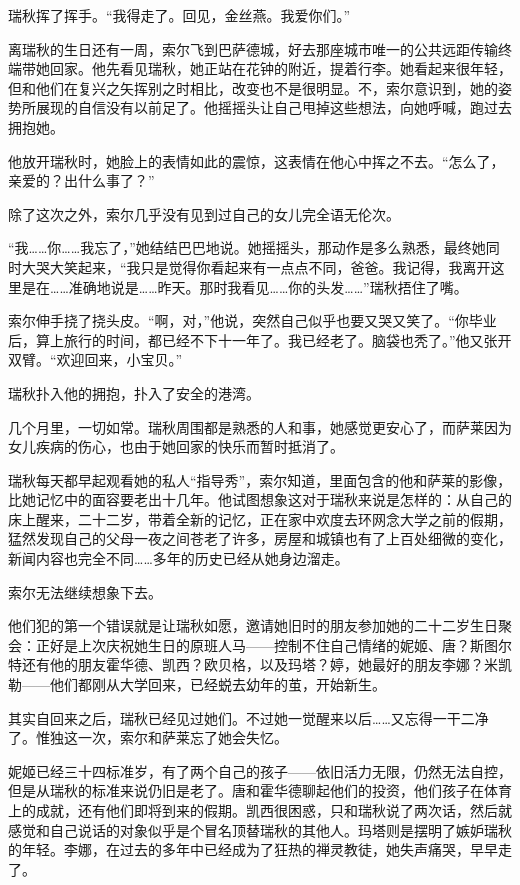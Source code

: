 \documentclass[AutoFakeBold=true]{book}
\begin{document}
瑞秋挥了挥手。``我得走了。回见，金丝燕。我爱你们。''

\vspace*{1em}

离瑞秋的生日还有一周，索尔飞到巴萨德城，好去那座城市唯一的公共远距传输终端带她回家。他先看见瑞秋，她正站在花钟的附近，提着行李。她看起来很年轻，但和他们在复兴之矢挥别之时相比，改变也不是很明显。不，索尔意识到，她的姿势所展现的自信没有以前足了。他摇摇头让自己甩掉这些想法，向她呼喊，跑过去拥抱她。

他放开瑞秋时，她脸上的表情如此的震惊，这表情在他心中挥之不去。``怎么了，亲爱的？出什么事了？''

除了这次之外，索尔几乎没有见到过自己的女儿完全语无伦次。

``我……你……我忘了，''她结结巴巴地说。她摇摇头，那动作是多么熟悉，最终她同时大哭大笑起来，``我只是觉得你看起来有一点点不同，爸爸。我记得，我离开这里是在……准确地说是……昨天。那时我看见……你的头发……''瑞秋捂住了嘴。

索尔伸手挠了挠头皮。``啊，对，''他说，突然自己似乎也要又哭又笑了。``你毕业后，算上旅行的时间，都已经不下十一年了。我已经老了。脑袋也秃了。''他又张开双臂。``欢迎回来，小宝贝。''

瑞秋扑入他的拥抱，扑入了安全的港湾。

\vspace*{1em}

几个月里，一切如常。瑞秋周围都是熟悉的人和事，她感觉更安心了，而萨莱因为女儿疾病的伤心，也由于她回家的快乐而暂时抵消了。

瑞秋每天都早起观看她的私人``指导秀''，索尔知道，里面包含的他和萨莱的影像，比她记忆中的面容要老出十几年。他试图想象这对于瑞秋来说是怎样的：从自己的床上醒来，二十二岁，带着全新的记忆，正在家中欢度去环网念大学之前的假期，猛然发现自己的父母一夜之间苍老了许多，房屋和城镇也有了上百处细微的变化，新闻内容也完全不同……多年的历史已经从她身边溜走。

索尔无法继续想象下去。

\vspace*{1em}

他们犯的第一个错误就是让瑞秋如愿，邀请她旧时的朋友参加她的二十二岁生日聚会：正好是上次庆祝她生日的原班人马——控制不住自己情绪的妮姬、唐？斯图尔特还有他的朋友霍华德、凯西？欧贝格，以及玛塔？婷，她最好的朋友李娜？米凯勒——他们都刚从大学回来，已经蜕去幼年的茧，开始新生。

其实自回来之后，瑞秋已经见过她们。不过她一觉醒来以后……又忘得一干二净了。惟独这一次，索尔和萨莱忘了她会失忆。

妮姬已经三十四标准岁，有了两个自己的孩子——依旧活力无限，仍然无法自控，但是从瑞秋的标准来说仍旧是老了。唐和霍华德聊起他们的投资，他们孩子在体育上的成就，还有他们即将到来的假期。凯西很困惑，只和瑞秋说了两次话，然后就感觉和自己说话的对象似乎是个冒名顶替瑞秋的其他人。玛塔则是摆明了嫉妒瑞秋的年轻。李娜，在过去的多年中已经成为了狂热的禅灵教徒，她失声痛哭，早早走了。
\end{document}
